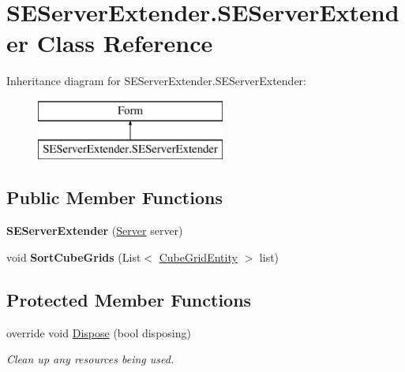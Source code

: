 \hypertarget{class_s_e_server_extender_1_1_s_e_server_extender}{}\section{S\+E\+Server\+Extender.\+S\+E\+Server\+Extender Class Reference}
\label{class_s_e_server_extender_1_1_s_e_server_extender}
Inheritance diagram for S\+E\+Server\+Extender.\+S\+E\+Server\+Extender\+:\begin{figure}[H]
\begin{center}
\leavevmode
\includegraphics[height=2.000000cm]{class_s_e_server_extender_1_1_s_e_server_extender}
\end{center}
\end{figure}
\subsection*{Public Member Functions}
\begin{DoxyCompactItemize}
\item 
\hypertarget{class_s_e_server_extender_1_1_s_e_server_extender_a98517e19275a0cf682d124f5fb4e4b0f}{}{\bfseries S\+E\+Server\+Extender} (\hyperlink{class_s_e_mod_a_p_i_extensions_1_1_a_p_i_1_1_server}{Server} server)\label{class_s_e_server_extender_1_1_s_e_server_extender_a98517e19275a0cf682d124f5fb4e4b0f}

\item 
\hypertarget{class_s_e_server_extender_1_1_s_e_server_extender_a62ee68c255c1770292bd8a5c7c61094f}{}void {\bfseries Sort\+Cube\+Grids} (List$<$ \hyperlink{class_s_e_mod_a_p_i_internal_1_1_a_p_i_1_1_entity_1_1_sector_1_1_sector_object_1_1_cube_grid_entity}{Cube\+Grid\+Entity} $>$ list)\label{class_s_e_server_extender_1_1_s_e_server_extender_a62ee68c255c1770292bd8a5c7c61094f}

\end{DoxyCompactItemize}
\subsection*{Protected Member Functions}
\begin{DoxyCompactItemize}
\item 
override void \hyperlink{class_s_e_server_extender_1_1_s_e_server_extender_afeae057b78ab411e40b0a57354b9746c}{Dispose} (bool disposing)
\begin{DoxyCompactList}\small\item\em Clean up any resources being used. \end{DoxyCompactList}\end{DoxyCompactItemize}


